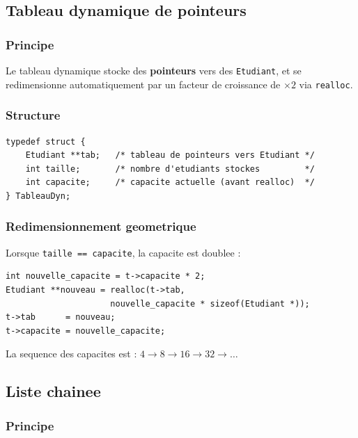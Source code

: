 \documentclass[12pt,a4paper]{article}
\begin{document}
\subsection{Tableau dynamique de pointeurs}

\subsubsection{Principe}

Le tableau dynamique stocke des \textbf{pointeurs} vers des
\texttt{Etudiant}, et se redimensionne automatiquement par un
facteur de croissance de $\times 2$ via \texttt{realloc}.

\subsubsection{Structure}

\begin{lstlisting}[caption={Structure TableauDyn}]
typedef struct {
    Etudiant **tab;   /* tableau de pointeurs vers Etudiant */
    int taille;       /* nombre d'etudiants stockes         */
    int capacite;     /* capacite actuelle (avant realloc)  */
} TableauDyn;
\end{lstlisting}

\subsubsection{Redimensionnement geometrique}

Lorsque \texttt{taille == capacite}, la capacite est doublee :

\begin{lstlisting}[caption={Redimensionnement par realloc}]
int nouvelle_capacite = t->capacite * 2;
Etudiant **nouveau = realloc(t->tab,
                     nouvelle_capacite * sizeof(Etudiant *));
t->tab      = nouveau;
t->capacite = nouvelle_capacite;
\end{lstlisting}

La sequence des capacites est : $4 \to 8 \to 16 \to 32 \to \ldots$

\subsection{Liste chainee}

\subsubsection{Principe}
\end{document}
